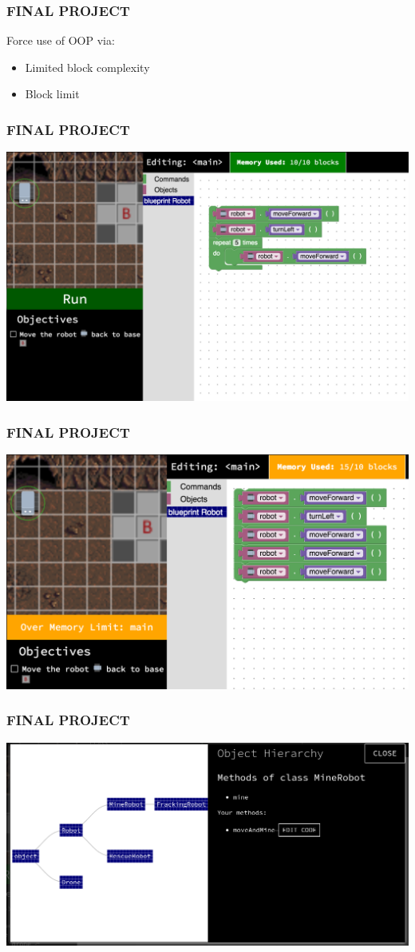 \documentclass{beamer}
\let\theframetitle\frametitle
\renewcommand\frametitle[1]{\theframetitle{\MakeUppercase{#1}}}
\begin{document}
\begin{frame}
\frametitle{Final Project}
Force use of OOP via:
\begin{itemize}
\item Limited block complexity
\item Block limit
\end{itemize}
\end{frame}

\begin{frame}
\frametitle{Final Project}
\includegraphics[width=\textwidth]{../report/game_screenshot}
\end{frame}

\begin{frame}
\frametitle{Final Project}
\includegraphics[width=\textwidth]{../report/over_memory}
\end{frame}

\begin{frame}
\frametitle{Final Project}
\includegraphics[width=\textwidth]{../report/hierarchy}
\end{frame}
\end{document}
